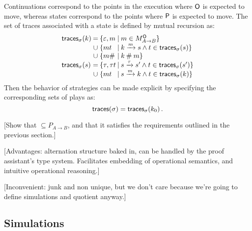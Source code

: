 Continuations correspond to
the points in the execution where $ \mathsf{O} $ is expected to move,
whereas states correspond to
the points where $ \mathsf{P} $ is expected to move.
The set of traces associated with a state is
defined by mutual recursion as:
\[
  \begin{array}{l@{\:}c@{\:\{}l@{\:\mid\:}l}
    \kw{traces}_\sigma(k) & = & \varepsilon, m &
      m \in M_{A \rightarrow B}^\kw{O} \} \\
    & \cup & m t &
      k \xrightarrow{m} s \wedge t \in \kw{traces}_\sigma(s) \} \\
    & \cup & m \# &
      k \: \# \: m \} \\
    \kw{traces}_\sigma(s) & = & \tau, \tau t &
      s \xrightarrow{\tau} s' \wedge t \in \kw{traces}_\sigma(s') \} \\
    & \cup & m t &
      s \xrightarrow{m} k \wedge t \in \kw{traces}_\sigma(k) \}
  \end{array}
\]
Then the behavior of strategies can be made explicit
by specifying the corresponding sets of plays as:
\[
   \mathsf{traces} (\sigma) =  \mathsf{traces} _\sigma(k_0) \,.
\]

[Show that $\subseteq P_{A \rightarrow B}$,
and that it satisfies the requirements outlined
in the previous section.]

[Advantages: alternation structure baked in,
can be handled by the proof assistant's type system.
Facilitates embedding of operational semantics,
and intuitive operational reasoning.]

[Inconvenient: junk and non unique,
but we don't care because we're going to
define simulations and quotient anyway.]

\subsection{Simulations}

